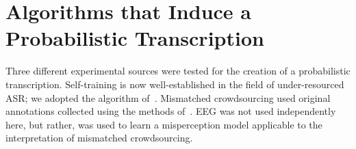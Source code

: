 \section{Algorithms that Induce a Probabilistic Transcription}

Three different experimental sources were tested for the creation of a
probabilistic transcription.  Self-training is now well-established in
the field of under-resourced ASR; we adopted the algorithm
of~\cite{vesely2013-semi}.  Mismatched crowdsourcing used original
annotations collected using the methods of~\cite{JHJ15b}.  EEG was not
used independently here, but rather, was used to learn a misperception
model applicable to the interpretation of mismatched crowdsourcing.
